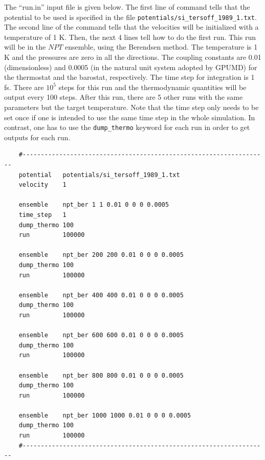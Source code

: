\documentclass[12pt,a4paper]{report}
\begin{document}
The ``run.in'' input file is given below. The first line of command tells that the potential to be used is specified in the file \verb"potentials/si_tersoff_1989_1.txt".  The second line of the command tells that the velocities will be initialized with a temperature of 1 K. Then, the next 4 lines tell how to do the first run. This run will be in the $NPT$ ensemble, using the Berendsen method. The temperature is 1 K and the pressures are zero in all the directions. The coupling constants are 0.01 (dimensionless) and 0.0005 (in the natural unit system adopted by GPUMD) for the thermostat and the barostat, respectively. The time step for integration is 1 fs. There are $10^5$ steps for this run and the thermodynamic quantities will be output every 100 steps. After this run, there are 5 other runs with the same parameters but the target temperature. Note that the time step only needs to be set once if one is intended to use the same time step in the whole simulation. In contrast, one has to use the \verb"dump_thermo" keyword for each run in order to get outputs for each run.

\begin{verbatim}
    #-------------------------------------------------------------------
    potential   potentials/si_tersoff_1989_1.txt
    velocity    1

    ensemble    npt_ber 1 1 0.01 0 0 0 0.0005
    time_step   1
    dump_thermo 100
    run         100000

    ensemble    npt_ber 200 200 0.01 0 0 0 0.0005
    dump_thermo 100
    run         100000

    ensemble    npt_ber 400 400 0.01 0 0 0 0.0005
    dump_thermo 100
    run         100000

    ensemble    npt_ber 600 600 0.01 0 0 0 0.0005
    dump_thermo 100
    run         100000

    ensemble    npt_ber 800 800 0.01 0 0 0 0.0005
    dump_thermo 100
    run         100000

    ensemble    npt_ber 1000 1000 0.01 0 0 0 0.0005
    dump_thermo 100
    run         100000
    #-------------------------------------------------------------------
\end{verbatim}
\end{document}
